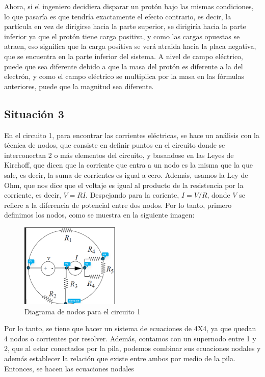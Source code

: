 \documentclass[12pt, letterpaper]{report}
\begin{document}
Ahora, si el ingeniero decidiera disparar un protón bajo las mismas condiciones, lo que pasaría es que tendría exactamente el efecto contrario, es decir, la partícula en vez de dirigirse hacia la parte superior, 
se dirigiría hacia la parte inferior ya que el protón tiene carga positiva, y como las cargas opuestas se atraen, eso significa que la carga positiva se verá atraida hacia la placa negativa, que se encuentra en la parte 
inferior del sistema. A nivel de campo eléctrico, puede que sea diferente debido a que la masa del protón es diferente a la del electrón, y como el campo eléctrico se multiplica por la masa en las fórmulas anteriores, 
puede que la magnitud sea diferente. 

\subsection*{Situación 3}
En el circuito 1, para encontrar las corrientes eléctricas, se hace un análisis con la técnica de nodos, que consiste en 
definir puntos en el circuito donde se interconectan 2 o más elementos del circuito, y basandose en las Leyes de Kirchoff, que dicen que la corriente que entra a 
un nodo es la misma que la que sale, es decir, la suma de corrientes es igual a cero. Además, usamos la Ley de Ohm, que nos dice que el voltaje es igual al producto de la 
resistencia por la corriente, es decir, $V = RI$. Despejando para la coriente, $I = V/R$, donde $V$ se refiere a la diferencia de potencial entre dos nodos. 
Por lo tanto, primero definimos los nodos, como se muestra en la siguiente imagen: 
\begin{figure}[H]
    \centering
    \includegraphics[height = 4cm]{Diagrama1.png}
    \caption{Diagrama de nodos para el circuito 1}
\end{figure}
Por lo tanto, se tiene que hacer un sistema de ecuaciones de 4X4, ya que quedan 4 nodos o corrientes por resolver. Además, contamos con un supernodo entre 1 y 2, 
que al estar conectados por la pila, podemos combinar sus ecuaciones nodales y además establecer la relación que existe entre ambos por medio de la pila. Entonces, se hacen las ecuaciones nodales 
\end{document}
